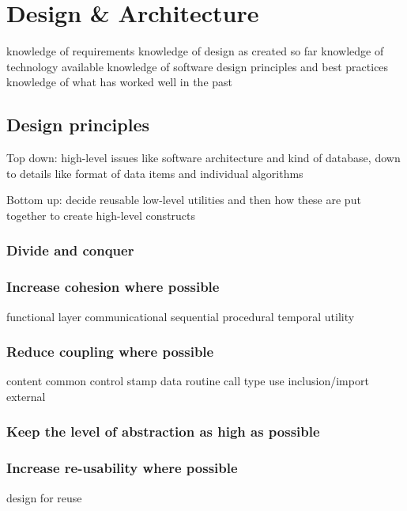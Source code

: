\chapter{Design \& Architecture}


knowledge of requirements
knowledge of design as created so far
knowledge of technology available
knowledge of software design principles and best practices
knowledge of what has worked well in the past


\section{Design principles}

Top down: high-level issues like software architecture and kind of database, down to details like format of data items and individual algorithms

Bottom up: decide reusable low-level utilities and then how these are put together to create high-level constructs

\subsection{Divide and conquer}

\subsection{Increase cohesion where possible}

functional
layer
communicational
sequential
procedural
temporal
utility

\subsection{Reduce coupling where possible}

content
common
control
stamp
data
routine call
type use
inclusion/import
external

\subsection{Keep the level of abstraction as high as possible}

\subsection{Increase re-usability where possible}

design for reuse

